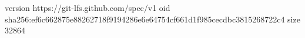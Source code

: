 version https://git-lfs.github.com/spec/v1
oid sha256:ef6c662875e88262718f9194286e6e64754cf661d1f985cecdbc3815268722c4
size 32864
